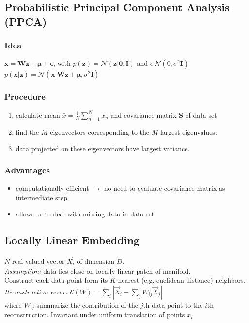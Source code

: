 \documentclass[9pt,parskip]{scrartcl}
\begin{document}
\begin{multicols*}{4}
\subsection*{Probabilistic Principal Component Analysis (PPCA)}
\subsubsection*{Idea}
$\mathbf{x} = \mathbf{Wz} + \boldsymbol{\mu} + \boldsymbol{\epsilon} $, with $p(\mathbf{z}) = \mathcal{N}(\mathbf{z}|\mathbf{0,I})$ and $\epsilon ~ \mathcal{N}(0, \sigma^2\mathbf{I})$ \\
$p(\mathbf{x}|\mathbf{z}) = \mathcal{N}(\mathbf{x}|\mathbf{Wz} + \boldsymbol{\mu}, \sigma^2\mathbf{I}) $
\subsubsection*{Procedure}
\begin{enumerate}
	\item calculate mean $\bar{x} = \frac 1 N \sum_{n=1}^{N}x_n$ and covariance matrix \textbf{S} of data set
	\item find the $M$ eigenvectors corresponding to the $M$ largest eigenvalues.
	\item data projected on these eigenvectors have largest variance.
\end{enumerate}
\subsubsection*{Advantages}
\begin{itemize}
	\item computationally efficient $\to$ no need to evaluate covariance matrix as intermediate step
	\item allows us to deal with missing data in data set
\end{itemize}


\subsection*{Locally Linear Embedding}
$N$ real valued vector $\vec{X}_i $ of dimension $D$.\\
\textit{Assumption: } data lies close on locally linear patch of manifold. \\
Construct each data point form its $K$ nearest (e.g. euclidean distance) neighbors. \\
\textit{Reconstruction error: }$\mathcal{E} (W) = \sum_i |\vec{X}_i -  \sum_j W_{ij} \vec{X}_j|$ \\
where $W_{ij}$ summarize the contribution of the $j$th data point to
the $i$th reconstruction. Invariant under uniform translation of points $x_i$ \\


\end{multicols*}
\end{document}
